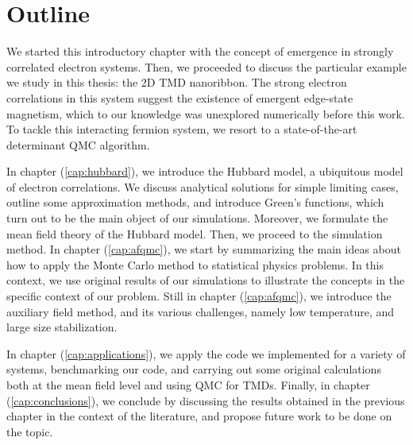 \section{Outline}
\label{sec:int_outline}

We started this introductory chapter with the concept of emergence in strongly correlated electron systems.
Then, we proceeded to discuss the particular example we study in this thesis: the \acs{2D} \acs{TMD} nanoribbon.
The strong electron correlations in this system suggest the existence of emergent edge-state magnetism, which to our knowledge was unexplored numerically before this work.
To tackle this interacting fermion system, we resort to a state-of-the-art determinant  \ac{QMC} algorithm.

In chapter (\ref{cap:hubbard}), we introduce the Hubbard model, a ubiquitous model of electron correlations.
We discuss analytical solutions for simple limiting cases, outline some approximation methods, and introduce Green's functions, which turn out to be the main object of our simulations.
Moreover, we formulate the mean field theory of the Hubbard model.
Then, we proceed to the simulation method.
In chapter (\ref{cap:afqmc}), we start by summarizing the main ideas about how to apply the Monte Carlo method to statistical physics problems.
In this context, we use original results of our simulations to illustrate the concepts in the specific context of our problem.
Still in chapter (\ref{cap:afqmc}), we introduce the auxiliary field method, and its various challenges, namely low temperature, and large size stabilization.

In chapter (\ref{cap:applications}), we apply the code we implemented for a variety of systems, benchmarking our code, and carrying out some original calculations both at the mean field level and using \acs{QMC} for \acp{TMD}.
Finally, in chapter (\ref{cap:conclusions}), we conclude by discussing the results obtained in the previous chapter in the context of the literature, and propose future work to be done on the topic.